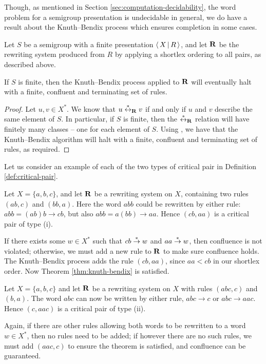 Though, as mentioned in Section \ref{sec:computation-decidability}, the word problem for a
semigroup presentation is undecidable in general, we do have a result about the
Knuth--Bendix process which ensures completion in some cases.

\begin{theorem}
  Let $S$ be a semigroup with a finite presentation $\left\langle \, X \, \middle| \, R \, \right\rangle$, and let $\mathbf{R}$
  be the rewriting system produced from $R$ by applying a shortlex ordering to
  all pairs, as described above.

  If $S$ is finite, then the Knuth--Bendix process applied to $\mathbf{R}$ will
  eventually halt with a finite, confluent and terminating set of rules.

  \begin{proof}
    Let $u,v \in X^*$.  We know that $u \stackrel{*}{\leftrightarrow}_{\mathbf{R}} v$ if and only if $u$ and
    $v$ describe the same element of $S$.  In particular, if $S$ is finite, then
    the $\stackrel{*}{\leftrightarrow}_{\mathbf{R}}$ relation will have finitely many classes -- one for each
    element of $S$.  Using \cite[Corollary 12.21]{cgt}, we have that
    the Knuth--Bendix algorithm will halt with a finite, confluent and terminating set of
    rules, as required.
  \end{proof}
\end{theorem}

Let us consider an example of each of the two types of critical pair in
Definition \ref{def:critical-pair}.

\begin{example}
  Let $X=\{a,b,c\}$, and let $\mathbf{R}$ be a rewriting system on $X$, containing
  two rules $(ab, c)$ and $(bb, a)$.  Here the word $abb$ could be
  rewritten by either rule: $abb = (ab)b \to cb$, but also
  $abb = a(bb) \to aa$.  Hence $(cb, aa)$ is a critical pair of type (i).

  If there exists some $w \in X^*$ such that $cb \stackrel{*}{\to} w$ and $aa \stackrel{*}{\to} w$,
  then confluence is not violated; otherwise, we must add a new rule to $\mathbf{R}$
  to make sure confluence holds.  The Knuth--Bendix process adds the rule
  $(cb, aa)$, since $aa < cb$ in our shortlex order.  Now Theorem
  \ref{thm:knuth-bendix} is satisfied.
\end{example}

\begin{example}
  Let $X=\{a,b,c\}$ and let $\mathbf{R}$ be a rewriting system on $X$ with rules
  $(abc, c)$ and $(b, a)$.  The word $abc$ can now be written by either rule,
  $abc \to c$ or $abc \to aac$.  Hence $(c, aac)$ is a critical pair of type
  (ii).

  Again, if there are other rules allowing both words to be rewritten to a word
  $w \in X^*$, then no rules need to be added; if however there are no such
  rules, we must add $(aac, c)$ to ensure the theorem is satisfied, and
  confluence can be guaranteed.
\end{example}


